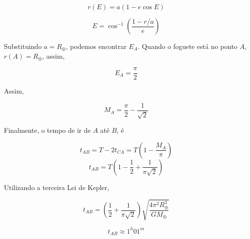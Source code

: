 \documentclass[11pt]{article}
\begin{document}
\begin{pproblem}
\begin{pssolution*}{}{}
\begin{alternativas}
            \[r(E)= a(1-e\cos E)\]

            \[E = \cos^{-1}\left(\frac{1-r/a}{e}\right)\]

            Substituindo \(a = R_\oplus\), podemos encontrar \(E_A\). Quando o foguete está no ponto \(A\), \(r(A)=R_\oplus\), assim, 

            \[E_A=\frac{\pi}{2}\]

            Assim, 

            \[M_A = \frac{\pi}{2}-\frac{1}{\sqrt{2}}\]

            Finalmente, o tempo de ir de \(A\) até \(B\), é 

            \[t_{AB} = T - 2t_{CA} = T\left(1 - \frac{M_A}{\pi}\right)\]
            \[t_{AB} = T\left(1-\frac{1}{2}+\frac{1}{\pi\sqrt2}\right)\]

            Utilizando a terceira Lei de Kepler, 

            \[t_{AB} = \left(\frac{1}{2}+\frac{1}{\pi\sqrt2}\right)\sqrt{\frac{4\pi^2R_{\oplus}^3}{GM_\oplus}} \]

            \[\boxed{t_{AB} \approx 1^h01^m}\]
            
      
        \end{alternativas}
    \end{pssolution*}
    
\end{pproblem}
\end{document}
